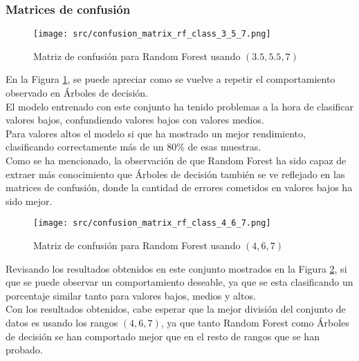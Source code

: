 \subsubsection*{Matrices de confusión}
\begin{figure}[H]
	\centering
	\texttt{[image: src/confusion\_matrix\_rf\_class\_3\_5\_7.png]}
	\caption{Matriz de confusión para Random Forest usando $(3.5,5.5,7)$}
	\label{fig:confusion_matrix_rf1}
\end{figure}
En la Figura \ref{fig:confusion_matrix_rf1}, se puede apreciar como se vuelve a repetir el comportamiento observado en Árboles de decisión. \\
El modelo entrenado con este conjunto ha tenido problemas a la hora de clasificar valores bajos, confundiendo valores bajos con valores medios.\\
Para valores altos el modelo si que ha mostrado un mejor rendimiento, clasificando correctamente más de un 80\% de esas muestras. \\
\linebreak
Como se ha mencionado, la observación de que Random Forest ha sido capaz de extraer más conocimiento que Árboles de decisión también se ve reflejado en las matrices de confusión, donde la cantidad de errores cometidos en valores bajos ha sido mejor.
\begin{figure}[H]
	\centering
	\texttt{[image: src/confusion\_matrix\_rf\_class\_4\_6\_7.png]}
	\caption{Matriz de confusión para Random Forest usando $(4,6,7)$}
	\label{fig:confusion_matrix_rf2}
\end{figure}
Revisando los resultados obtenidos en este conjunto mostrados en la Figura \ref{fig:confusion_matrix_rf2}, si que se puede observar un comportamiento deseable, ya que se esta clasificando un porcentaje similar tanto para valores bajos, medios y altos.\\
\linebreak
Con los resultados obtenidos, cabe esperar que la mejor división del conjunto de datos es usando los rangos $(4,6,7)$, ya que tanto Random Forest como Árboles de decisión se han comportado mejor que en el resto de rangos que se han probado.
\clearpage

